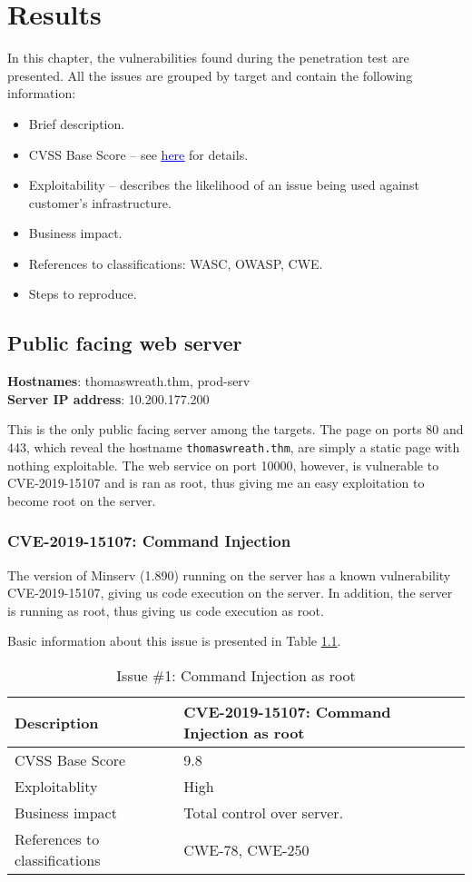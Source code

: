 \chapter{Results}
In this chapter, the vulnerabilities found during the penetration test are presented. All the issues are grouped by target and contain the following information:
\begin{itemize}
	\item Brief description.
	\item CVSS Base Score -- see \href{https://www.first.org/cvss/user-guide}{\textcolor{blue}{\underline{here}}} for details.
	\item Exploitability -- describes the likelihood of an issue being used against customer's infrastructure.
	\item Business impact.
	\item References to classifications: WASC, OWASP, CWE.
	\item Steps to reproduce.
\end{itemize}

\newpage

\section{Public facing web server}
\textbf{Hostnames}: thomaswreath.thm, prod-serv\\
\textbf{Server IP address}: 10.200.177.200

This is the only public facing server among the targets. The page on ports 80 and 443, which reveal the hostname \lstinline{thomaswreath.thm}, are simply a static page with nothing exploitable. The web service on port 10000, however, is vulnerable to CVE-2019-15107 and is ran as root, thus giving me an easy exploitation to become root on the server.\\

\subsection{CVE-2019-15107: Command Injection} \label{ss:issue-1}
The version of Minserv (1.890) running on the server has a known vulnerability CVE-2019-15107, giving us code execution on the server. In addition, the server is running as root, thus giving us code execution as root.

Basic information about this issue is presented in Table \ref{tbl:issue-1}.
\begin{table}[h]
	\centering
	\begin{tabular}{| l | p{10cm} |}
		\hline
		Description & CVE-2019-15107: Command Injection as root \\
		\hline
		CVSS Base Score & 9.8 \\
		\hline
		Exploitablity & High \\
		\hline
		Business impact & Total control over server. \\
		\hline
    References to classifications & CWE-78, CWE-250 \\
		\hline
	\end{tabular}
\caption{Issue \#1: Command Injection as root}
\label{tbl:issue-1}
\end{table}

